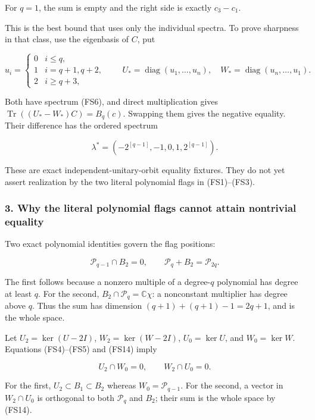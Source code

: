\documentclass{article}
\begin{document}
For \(q=1\), the sum is empty and the right side is exactly \(c_3-c_1\).

This is the best bound that uses only the individual spectra. To prove sharpness in that class, use the eigenbasis of \(C\), put

\[
u_i=\begin{cases}
0&i\le q,\\1&i=q+1,q+2,\\2&i\ge q+3,
\end{cases}
\qquad
U_*=\operatorname{diag}(u_1,\ldots,u_n),
\quad W_*=\operatorname{diag}(u_n,\ldots,u_1).
\tag{FS12}
\]

Both have spectrum (FS6), and direct multiplication gives \(\operatorname{Tr}((U_*-W_*)C)=B_q(c)\). Swapping them gives the negative equality. Their difference has the ordered spectrum

\[
\lambda^*=(-2^{[q-1]},-1,0,1,2^{[q-1]}).
\tag{FS13}
\]

These are exact independent-unitary-orbit equality fixtures. They do not yet assert realization by the two literal polynomial flags in (FS1)--(FS3).

\subsubsection{3. Why the literal polynomial flags cannot attain nontrivial equality}\label{endpoint-four_window_sharpness--why-the-literal-polynomial-flags-cannot-attain-nontrivial-equality}

Two exact polynomial identities govern the flag positions:

\[
\mathcal P_{q-1}\cap B_2=0,
\qquad \mathcal P_q+B_2=\mathcal P_{2q}.
\tag{FS14}
\]

The first follows because a nonzero multiple of a degree-\(q\) polynomial has degree at least \(q\). For the second, \(B_2\cap\mathcal P_q=\mathbb C\chi\): a nonconstant multiplier has degree above \(q\). Thus the sum has dimension \((q+1)+(q+1)-1=2q+1\), and is the whole space.

Let \(U_2=\ker(U-2I)\), \(W_2=\ker(W-2I)\), \(U_0=\ker U\), and \(W_0=\ker W\). Equations (FS4)--(FS5) and (FS14) imply

\[
U_2\cap W_0=0,
\qquad W_2\cap U_0=0.
\tag{FS15}
\]

For the first, \(U_2\subset B_1\subset B_2\) whereas \(W_0=\mathcal P_{q-1}\). For the second, a vector in \(W_2\cap U_0\) is orthogonal to both \(\mathcal P_q\) and \(B_2\); their sum is the whole space by (FS14).
\end{document}
